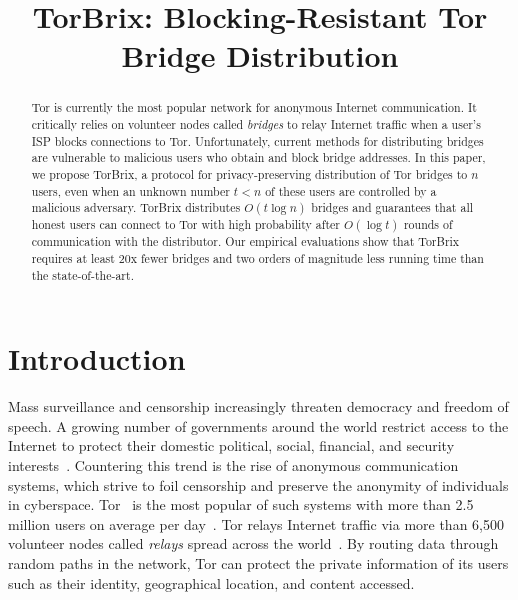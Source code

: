 \documentclass[letterpaper,twocolumn,10pt]{article}
\title{TorBrix: Blocking-Resistant Tor Bridge Distribution}
\newcommand{\sfsize}{\fontsize{0.73\baselineskip}{0.73\baselineskip}\selectfont}
\newcommand{\sans}[1]{\textsf{\sfsize \mbox{#1}}}
\newcommand{\brix}{\sans{TorBrix}\xspace}
\begin{document}
	\sloppy
	\maketitle

\begin{abstract}

\vspace{0.5em}
	Tor is currently the most popular network for anonymous Internet communication. It critically relies on volunteer nodes called \emph{bridges} to relay Internet traffic when a user's ISP blocks connections to Tor. 
	Unfortunately, current methods for distributing bridges are vulnerable to malicious users who obtain and block bridge addresses.
	In this paper, we propose \brix, a protocol for privacy-preserving distribution of Tor bridges to $n$ users, even when an unknown number ${t < n}$ of these users are controlled by a malicious adversary. \brix distributes $O(t\log{n})$ bridges and guarantees that all honest users can connect to Tor with high probability after $O(\log{t})$ rounds of communication with the distributor. 
	Our empirical evaluations show that \brix requires at least 20x fewer bridges and two orders of magnitude less running time than the state-of-the-art.
\end{abstract}

\section{Introduction}
Mass surveillance and censorship increasingly threaten democracy and freedom of speech. A growing number of governments around the world restrict access to the Internet to protect their domestic political, social, financial, and security interests~\cite{Turner:2016:Surveillance,Rushe:2012:Censorship}. Countering this trend is the rise of anonymous communication systems, which strive to foil censorship and preserve the anonymity of individuals in cyberspace. Tor~\cite{dingledine:2004} is the most popular of such systems with more than 2.5 million users on average per day~\cite{Tor:Users}. Tor relays Internet traffic via more than 6,500 volunteer nodes called \emph{relays} spread across the world~\cite{Tor:Relays}. By routing data through random paths in the network, Tor can protect the private information of its users such as their identity, geographical location, and content accessed.
\end{document}

